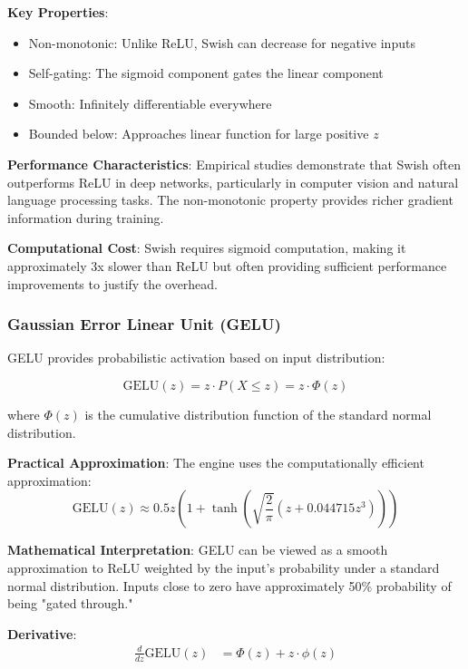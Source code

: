 \documentclass[11pt,a4paper]{report}
\begin{document}
\textbf{Key Properties}:
\begin{itemize}
\item Non-monotonic: Unlike ReLU, Swish can decrease for negative inputs
\item Self-gating: The sigmoid component gates the linear component
\item Smooth: Infinitely differentiable everywhere
\item Bounded below: Approaches linear function for large positive $z$
\end{itemize}

\textbf{Performance Characteristics}: Empirical studies demonstrate that Swish often outperforms ReLU in deep networks, particularly in computer vision and natural language processing tasks. The non-monotonic property provides richer gradient information during training.

\textbf{Computational Cost}: Swish requires sigmoid computation, making it approximately 3x slower than ReLU but often providing sufficient performance improvements to justify the overhead.

\subsubsection{Gaussian Error Linear Unit (GELU)}

GELU provides probabilistic activation based on input distribution:

\begin{equation}
\text{GELU}(z) = z \cdot P(X \leq z) = z \cdot \Phi(z)
\end{equation}

where $\Phi(z)$ is the cumulative distribution function of the standard normal distribution.

\textbf{Practical Approximation}: The engine uses the computationally efficient approximation:
\begin{equation}
\text{GELU}(z) \approx 0.5z\left(1 + \tanh\left(\sqrt{\frac{2}{\pi}}(z + 0.044715z^3)\right)\right)
\end{equation}

\textbf{Mathematical Interpretation}: GELU can be viewed as a smooth approximation to ReLU weighted by the input's probability under a standard normal distribution. Inputs close to zero have approximately 50\% probability of being "gated through."

\textbf{Derivative}: 
\begin{align}
\frac{d}{dz}\text{GELU}(z) &= \Phi(z) + z \cdot \phi(z)
\end{align}
\end{document}
